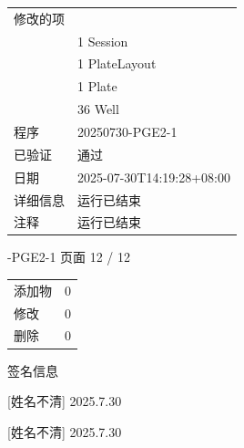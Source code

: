 \documentclass[UTF8,10pt,a4paper,fontset=fandol]{ctexart}
\newcommand{\fieldvalue}[1]{#1}
\newcommand{\handwritten}[1]{#1}
\begin{document}
\begin{tabular}{ll}
\multicolumn{2}{l}{修改的项}\\
&
\fieldvalue{1}\quad
\fieldvalue{Session}\\
&
\fieldvalue{1}\quad
\fieldvalue{PlateLayout}\\
&
\fieldvalue{1}\quad
\fieldvalue{Plate}\\
&
\fieldvalue{36}\quad
\fieldvalue{Well}\\[2pt]

程序 &
\fieldvalue{20250730-PGE2-1}\\
已验证 &
\fieldvalue{通过}\\
日期 &
\fieldvalue{2025-07-30T14:19:28+08:00}\\
详细信息 &
\fieldvalue{运行已结束}\\
注释 &
\fieldvalue{运行已结束}
\end{tabular}


\newpage

-PGE2-1 \hfill 页面 12 / 12

\noindent
\begin{tabular}{ll}
添加物 & 0 \\
修改 & 0 \\
删除 & 0
\end{tabular}

\medskip

签名信息

\vfill

\handwritten{[姓名不清]}\quad
\handwritten{2025.7.30}

\bigskip

\handwritten{[姓名不清]}\quad
\handwritten{2025.7.30}
\end{document}
